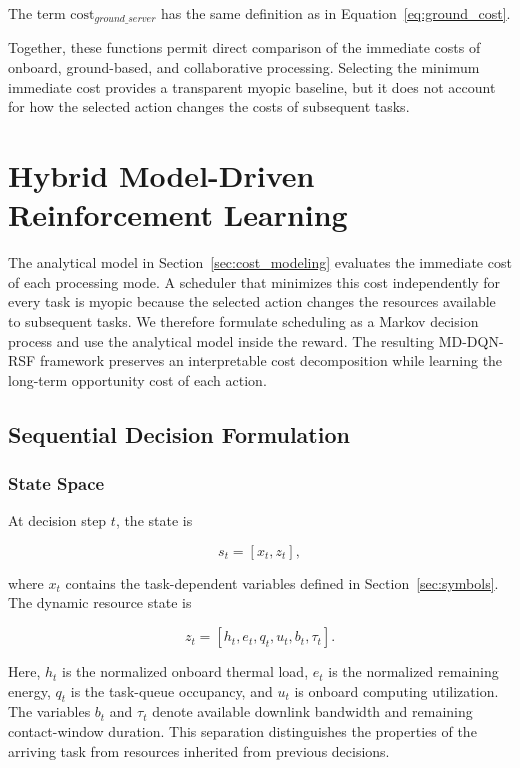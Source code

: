 \documentclass[lettersize,journal]{IEEEtran}
\begin{document}
The term $\mathrm{cost}_{ground\_server}$ has the same definition as in Equation~\eqref{eq:ground_cost}.

Together, these functions permit direct comparison of the immediate costs of onboard, ground-based, and collaborative processing. Selecting the minimum immediate cost provides a transparent myopic baseline, but it does not account for how the selected action changes the costs of subsequent tasks.


\section{Hybrid Model-Driven Reinforcement Learning}
\label{sec:mdrl}

The analytical model in Section~\ref{sec:cost_modeling} evaluates the immediate cost of each processing mode. A scheduler that minimizes this cost independently for every task is myopic because the selected action changes the resources available to subsequent tasks. We therefore formulate scheduling as a Markov decision process and use the analytical model inside the reward. The resulting MD-DQN-RSF framework preserves an interpretable cost decomposition while learning the long-term opportunity cost of each action.

\subsection{Sequential Decision Formulation}

\subsubsection{State Space}

At decision step $t$, the state is

\begin{equation}
s_t = [x_t,z_t],
\label{eq:dynamic_state}
\end{equation}

where $x_t$ contains the task-dependent variables defined in Section~\ref{sec:symbols}. The dynamic resource state is

\begin{equation}
z_t = [h_t,e_t,q_t,u_t,b_t,\tau_t].
\label{eq:resource_state}
\end{equation}

Here, $h_t$ is the normalized onboard thermal load, $e_t$ is the normalized remaining energy, $q_t$ is the task-queue occupancy, and $u_t$ is onboard computing utilization. The variables $b_t$ and $\tau_t$ denote available downlink bandwidth and remaining contact-window duration. This separation distinguishes the properties of the arriving task from resources inherited from previous decisions.
\end{document}
